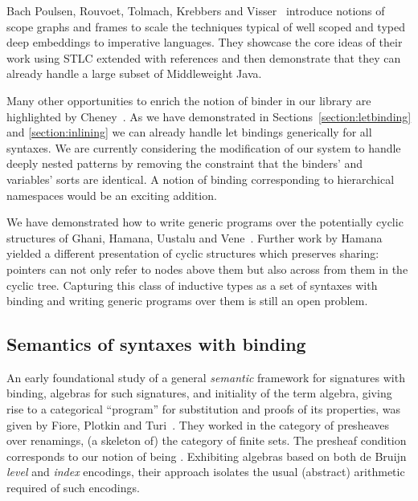 Bach Poulsen, Rouvoet, Tolmach, Krebbers and Visser~\citeyear{BachPoulsen}
introduce notions of scope graphs and frames to scale the techniques typical
of well scoped and typed deep embeddings to imperative languages.
They showcase the core ideas of their work using STLC extended with references
and then demonstrate that they can already handle a large subset of Middleweight
Java.

Many other opportunities to enrich the notion of binder in our library are
highlighted by Cheney~\citeyear{DBLP:conf/icfp/Cheney05a}. As we have demonstrated
in Sections~\ref{section:letbinding} and \ref{section:inlining} we can already
handle let bindings generically for all syntaxes. We are currently considering
the modification of our system to handle deeply nested patterns by removing the
constraint that the binders' and variables' sorts are identical. A notion of
binding corresponding to hierarchical namespaces would be an exciting addition.

We have demonstrated how to write generic programs over the potentially
cyclic structures of Ghani, Hamana, Uustalu and Vene~\citeyear{ghani2006representing}.
Further work by Hamana~\citeyear{Hamana2009} yielded a different presentation
of cyclic structures which preserves sharing: pointers can not only refer
to nodes above them but also across from them in the cyclic tree. Capturing
this class of inductive types as a set of syntaxes with binding and writing
generic programs over them is still an open problem.

\subsection{Semantics of syntaxes with binding} An early foundational study
of a general \emph{semantic} framework for signatures with binding, algebras
for such signatures, and initiality of the term algebra, giving rise to a
categorical ``program'' for substitution and proofs of its properties, was given
by Fiore, Plotkin and Turi~\cite{FiorePlotkinTuri99}. They worked in the category of presheaves
over renamings, (a skeleton of) the category of finite sets. The presheaf
condition corresponds to our notion of being . Exhibiting
algebras based on both de Bruijn \emph{level} and \emph{index} encodings,
their approach isolates the usual (abstract) arithmetic required of such encodings.

